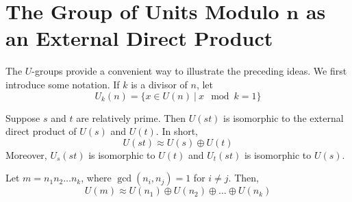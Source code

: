 \section{The Group of Units Modulo $\mathbf{n}$ as an External Direct Product}

\begin{remark}
	The $U$-groups provide a convenient way to illustrate the preceding ideas. We first introduce some notation. If $k$ is a divisor of $n$, let
	\[ U_k(n) = \{x \in U(n)\ \vert\ x \mod k = 1\} \]
\end{remark}

\begin{theorem}
	Suppose $s$ and $t$ are relatively prime. Then $U(st)$ is isomorphic to the external direct product of $U(s)$ and $U(t)$. In short,
	\[ U(st) \approx U(s) \oplus U(t) \]
	Moreover, $U_s(st)$ is isomorphic to $U(t)$ and $U_t(st)$ is isomorphic to $U(s)$.
\end{theorem}

\begin{corollary}
	Let $m = n_1n_2\dots n_k$, where $\gcd(n_i,n_j)=1$ for $i \neq j$. Then,
	\[ U(m) \approx U(n_1) \oplus U(n_2) \oplus \dots \oplus U(n_k) \]
\end{corollary}

